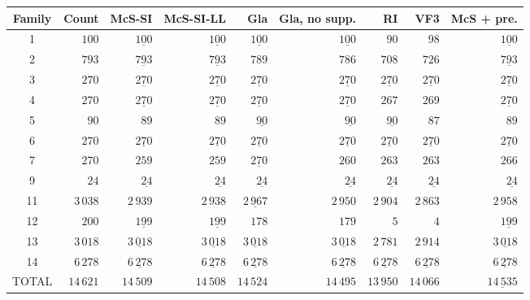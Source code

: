 
\begin{tabular}{crrrrrrrr}
    \toprule
    Family & Count & McS-SI & McS-SI-LL & Gla & Gla, no supp. & RI & VF3 & McS + pre.\\
    \midrule

1 & $100$ & $\underline{100}$ & $\underline{100}$ & $\underline{100}$ & $\underline{100}$ & $90$ & $98$ & $\underline{100}$\\
2 & $793$ & $\underline{793}$ & $\underline{793}$ & $789$ & $786$ & $708$ & $726$ & $\underline{793}$\\
3 & $270$ & $\underline{270}$ & $\underline{270}$ & $\underline{270}$ & $\underline{270}$ & $\underline{270}$ & $\underline{270}$ & $\underline{270}$\\
4 & $270$ & $\underline{270}$ & $\underline{270}$ & $\underline{270}$ & $\underline{270}$ & $267$ & $269$ & $\underline{270}$\\
5 & $90$ & $89$ & $89$ & $\underline{90}$ & $\underline{90}$ & $\underline{90}$ & $87$ & $89$\\
6 & $270$ & $\underline{270}$ & $\underline{270}$ & $\underline{270}$ & $\underline{270}$ & $\underline{270}$ & $\underline{270}$ & $\underline{270}$\\
7 & $270$ & $259$ & $259$ & $\underline{270}$ & $260$ & $263$ & $263$ & $266$\\
9 & $24$ & $\underline{24}$ & $\underline{24}$ & $\underline{24}$ & $\underline{24}$ & $\underline{24}$ & $\underline{24}$ & $\underline{24}$\\
11 & $3\,038$ & $2\,939$ & $2\,938$ & $\underline{2\,967}$ & $2\,950$ & $2\,904$ & $2\,863$ & $2\,958$\\
12 & $200$ & $\underline{199}$ & $\underline{199}$ & $178$ & $179$ & $5$ & $4$ & $\underline{199}$\\
13 & $3\,018$ & $\underline{3\,018}$ & $\underline{3\,018}$ & $\underline{3\,018}$ & $\underline{3\,018}$ & $2\,781$ & $2\,914$ & $\underline{3\,018}$\\
14 & $6\,278$ & $\underline{6\,278}$ & $\underline{6\,278}$ & $\underline{6\,278}$ & $\underline{6\,278}$ & $\underline{6\,278}$ & $\underline{6\,278}$ & $\underline{6\,278}$\\
TOTAL & $14\,621$ & $14\,509$ & $14\,508$ & $14\,524$ & $14\,495$ & $13\,950$ & $14\,066$ & $\underline{14\,535}$\\

    \bottomrule
\end{tabular}

